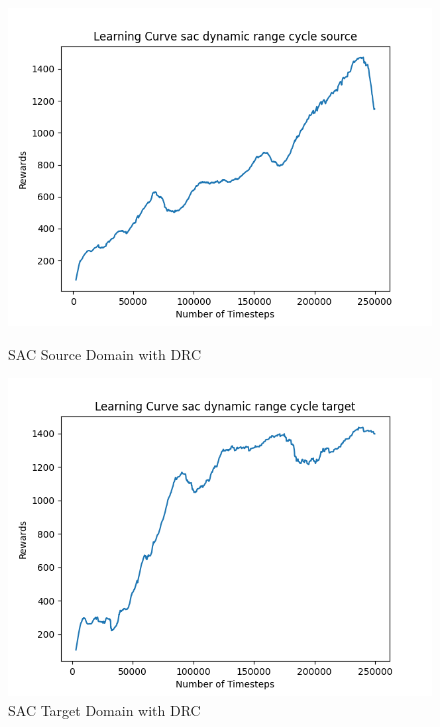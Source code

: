 \documentclass[11pt]{article}
\begin{document}
\begin{figure}[H]
    \centering
    \begin{minipage}{0.45\textwidth}
        \centering
        \includegraphics[width=\textwidth]{../images/Learning_Curve_SAC_DRC_Source.png}
        \caption{SAC Source Domain with DRC}
        \label{fig:sac_source_drc}
    \end{minipage}
    \hfill
    \begin{minipage}{0.45\textwidth}
        \centering
        \includegraphics[width=\textwidth]{../images/Learning_Curve_SAC_DRC_Target.png}
        \caption{SAC Target Domain with DRC}
        \label{fig:sac_target_drc}
    \end{minipage}
    \vfill

\end{figure}
\end{document}
